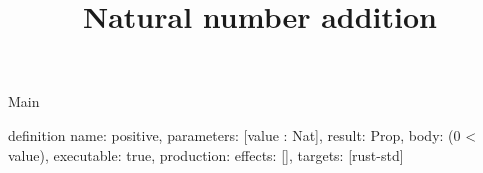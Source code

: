 \begin{lexlean}{Main}
\title{Natural number addition}
\begin{semanticmodule}
definition{
  name: positive,
  parameters: [value : Nat],
  result: Prop,
  body: (0 < value),
  executable: true,
  production: {effects: [], targets: [rust-std]}
}
\end{semanticmodule}
\end{lexlean}
